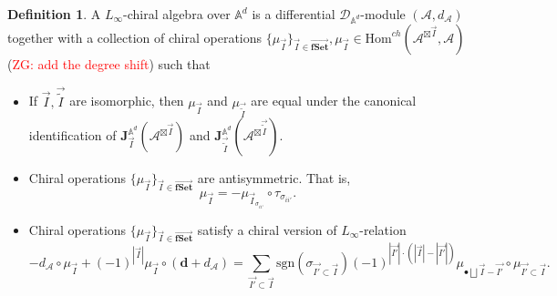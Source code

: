 \documentclass[11pt]{amsart}
\theoremstyle{definition}
\newtheorem{defn}[thm]{Definition}
\theoremstyle{remark}
\numberwithin{equation}{section}
\newcommand{\Gui}[1]{(\textcolor{red}{ZG: #1})}
\begin{document}
\begin{defn}
    A $L_{\infty}$-chiral algebra over $\mathbb{A}^d$ is a differential $\mathcal{D}_{\mathbb{A}^d}$-module $(\mathcal{A},d_{\mathcal{A}})$ together with a collection of chiral operations $\{\mu_{\vec{I}}\}_{\vec{I}\in \overrightarrow{\mathbf{fSet}}}, \mu_{\vec{I}}\in   \mathrm{Hom}^{ch}(\mathcal{A}^{\boxtimes\vec{I}},\mathcal{A})$ \Gui{add the degree shift} such that

    \begin{itemize}
        \item If $\vec{I},\vec{\tilde{I}}$ are isomorphic, then $\mu_{\vec{I}}$ and $\mu_{\vec{\tilde{I}}}$ are equal under the canonical identification of $\mathbf{J}^{\mathbb{A}^d}_{\vec{I}}(\mathcal{A}^{\boxtimes\vec{I}})$ and $\mathbf{J}^{\mathbb{A}^d}_{\vec{\tilde{I}}}(\mathcal{A}^{\boxtimes\vec{\tilde{I}}})$.

        \item Chiral operations $\{\mu_{\vec{I}}\}_{\vec{I}\in \overrightarrow{\mathbf{fSet}}}$ are antisymmetric. That is,
        $$
        \mu_{\vec{I}}=-\mu_{\vec{I}_{\sigma_{ii'}}}\circ \tau_{\sigma_{ii'}}.
        $$


        \item Chiral operations $\{\mu_{\vec{I}}\}_{\vec{I}\in \overrightarrow{\mathbf{fSet}}}$ satisfy a chiral version of $L_{\infty}$-relation
        $$
        -d_{\mathcal{A}}\circ \mu_{\vec{I}}+(-1)^{|\vec{I}|}\mu_{\vec{I}}\circ (\mathbf{d}+d_{\mathcal{A}})=\sum_{\vec{I'}\subset \vec{I}}\mathrm{sgn}(\sigma_{\vec{I'}\subset \vec{I}})(-1)^{|\vec{I'}|\cdot (|\vec{I}|-|\vec{I'}|)}\mu_{\bullet\bigsqcup \vec{I}-\vec{I'}}\circ \mu_{\vec{I'}\subset \vec{I}}.
        $$
    \end{itemize}

\end{defn}
\end{document}
